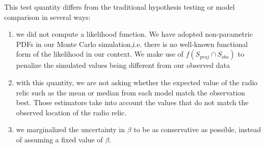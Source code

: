 \documentclass[letterpaper,useAMS,usenatbib]{mn2e}
\begin{document}
This test quantity differs from the traditional hypothesis testing or model comparison in several ways: 
\begin{enumerate}
\item we did not compute a likelihood function.  We have adopted
non-parametric PDFs in our Monte Carlo simulation,i.e. there is no well-known
functional form of the likelihood in our context. We make use of
$f(S_{proj} \cap S_{obs})$ to penalize the simulated values being different from our observed data
\item with this quantity, we are not asking whether the expected value of
	the radio relic such as the mean or median from each model match the
	observation best. Those estimators take into account the values that do not match the observed location of the radio relic. 
\item we marginalized the uncertainty in $\beta$ to be as conservative
	as possible, instead of assuming a fixed value of $\beta$.
\end{enumerate} \par
\end{document}
